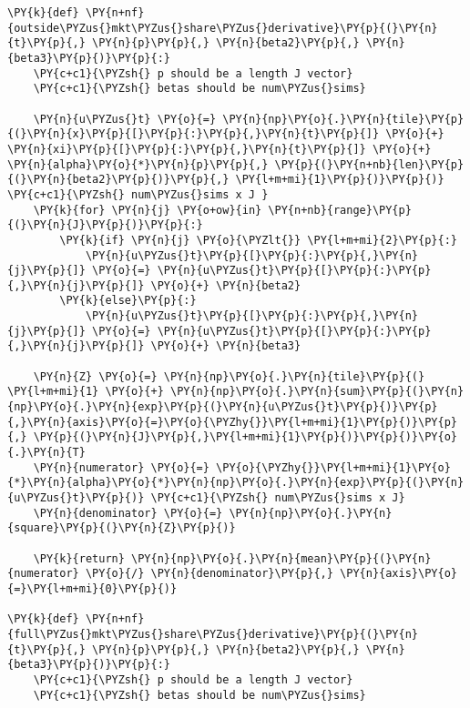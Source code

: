 \begin{tcolorbox}[breakable, size=fbox, boxrule=1pt, pad at break*=1mm,colback=cellbackground, colframe=cellborder]
\begin{Verbatim}[commandchars=\\\{\}]
\PY{k}{def} \PY{n+nf}{outside\PYZus{}mkt\PYZus{}share\PYZus{}derivative}\PY{p}{(}\PY{n}{t}\PY{p}{,} \PY{n}{p}\PY{p}{,} \PY{n}{beta2}\PY{p}{,} \PY{n}{beta3}\PY{p}{)}\PY{p}{:}
    \PY{c+c1}{\PYZsh{} p should be a length J vector}
    \PY{c+c1}{\PYZsh{} betas should be num\PYZus{}sims}

    \PY{n}{u\PYZus{}t} \PY{o}{=} \PY{n}{np}\PY{o}{.}\PY{n}{tile}\PY{p}{(}\PY{n}{x}\PY{p}{[}\PY{p}{:}\PY{p}{,}\PY{n}{t}\PY{p}{]} \PY{o}{+} \PY{n}{xi}\PY{p}{[}\PY{p}{:}\PY{p}{,}\PY{n}{t}\PY{p}{]} \PY{o}{+} \PY{n}{alpha}\PY{o}{*}\PY{n}{p}\PY{p}{,} \PY{p}{(}\PY{n+nb}{len}\PY{p}{(}\PY{n}{beta2}\PY{p}{)}\PY{p}{,} \PY{l+m+mi}{1}\PY{p}{)}\PY{p}{)} \PY{c+c1}{\PYZsh{} num\PYZus{}sims x J }
    \PY{k}{for} \PY{n}{j} \PY{o+ow}{in} \PY{n+nb}{range}\PY{p}{(}\PY{n}{J}\PY{p}{)}\PY{p}{:}
        \PY{k}{if} \PY{n}{j} \PY{o}{\PYZlt{}} \PY{l+m+mi}{2}\PY{p}{:}
            \PY{n}{u\PYZus{}t}\PY{p}{[}\PY{p}{:}\PY{p}{,}\PY{n}{j}\PY{p}{]} \PY{o}{=} \PY{n}{u\PYZus{}t}\PY{p}{[}\PY{p}{:}\PY{p}{,}\PY{n}{j}\PY{p}{]} \PY{o}{+} \PY{n}{beta2}
        \PY{k}{else}\PY{p}{:}
            \PY{n}{u\PYZus{}t}\PY{p}{[}\PY{p}{:}\PY{p}{,}\PY{n}{j}\PY{p}{]} \PY{o}{=} \PY{n}{u\PYZus{}t}\PY{p}{[}\PY{p}{:}\PY{p}{,}\PY{n}{j}\PY{p}{]} \PY{o}{+} \PY{n}{beta3}

    \PY{n}{Z} \PY{o}{=} \PY{n}{np}\PY{o}{.}\PY{n}{tile}\PY{p}{(} \PY{l+m+mi}{1} \PY{o}{+} \PY{n}{np}\PY{o}{.}\PY{n}{sum}\PY{p}{(}\PY{n}{np}\PY{o}{.}\PY{n}{exp}\PY{p}{(}\PY{n}{u\PYZus{}t}\PY{p}{)}\PY{p}{,}\PY{n}{axis}\PY{o}{=}\PY{o}{\PYZhy{}}\PY{l+m+mi}{1}\PY{p}{)}\PY{p}{,} \PY{p}{(}\PY{n}{J}\PY{p}{,}\PY{l+m+mi}{1}\PY{p}{)}\PY{p}{)}\PY{o}{.}\PY{n}{T}
    \PY{n}{numerator} \PY{o}{=} \PY{o}{\PYZhy{}}\PY{l+m+mi}{1}\PY{o}{*}\PY{n}{alpha}\PY{o}{*}\PY{n}{np}\PY{o}{.}\PY{n}{exp}\PY{p}{(}\PY{n}{u\PYZus{}t}\PY{p}{)} \PY{c+c1}{\PYZsh{} num\PYZus{}sims x J}
    \PY{n}{denominator} \PY{o}{=} \PY{n}{np}\PY{o}{.}\PY{n}{square}\PY{p}{(}\PY{n}{Z}\PY{p}{)}

    \PY{k}{return} \PY{n}{np}\PY{o}{.}\PY{n}{mean}\PY{p}{(}\PY{n}{numerator} \PY{o}{/} \PY{n}{denominator}\PY{p}{,} \PY{n}{axis}\PY{o}{=}\PY{l+m+mi}{0}\PY{p}{)}

\PY{k}{def} \PY{n+nf}{full\PYZus{}mkt\PYZus{}share\PYZus{}derivative}\PY{p}{(}\PY{n}{t}\PY{p}{,} \PY{n}{p}\PY{p}{,} \PY{n}{beta2}\PY{p}{,} \PY{n}{beta3}\PY{p}{)}\PY{p}{:}
    \PY{c+c1}{\PYZsh{} p should be a length J vector}
    \PY{c+c1}{\PYZsh{} betas should be num\PYZus{}sims}


\end{Verbatim}
\end{tcolorbox}
